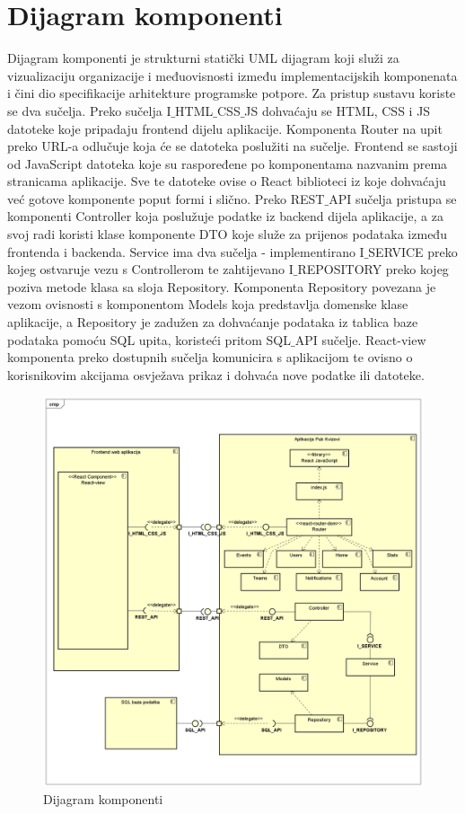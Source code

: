 		\eject
		\section{Dijagram komponenti}
		
			Dijagram komponenti je strukturni statički UML dijagram koji služi za vizualizaciju organizacije i međuovisnosti između implementacijskih komponenata i čini dio specifikacije arhitekture programske potpore. Za pristup sustavu koriste se dva sučelja. Preko sučelja I$\_$HTML$\_$CSS$\_$JS dohvaćaju se HTML, CSS i JS datoteke koje pripadaju frontend dijelu aplikacije. Komponenta Router na upit preko URL-a odlučuje koja će se datoteka poslužiti na sučelje. Frontend se sastoji od JavaScript datoteka koje su raspoređene po komponentama nazvanim prema stranicama aplikacije. Sve te datoteke ovise o React biblioteci iz koje dohvaćaju već gotove komponente poput formi i slično. Preko REST$\_$API sučelja pristupa se komponenti Controller koja poslužuje podatke iz backend dijela aplikacije, a za svoj radi koristi klase komponente DTO koje služe za prijenos podataka između frontenda i backenda. Service ima dva sučelja - implementirano I$\_$SERVICE preko kojeg ostvaruje vezu s Controllerom te zahtijevano I$\_$REPOSITORY preko kojeg poziva metode klasa sa sloja Repository. Komponenta Repository povezana je vezom ovisnosti s komponentom Models koja predstavlja domenske klase aplikacije, a Repository je zadužen za dohvaćanje podataka iz tablica baze podataka pomoću SQL upita, koristeći pritom SQL$\_$API sučelje. React-view komponenta preko dostupnih sučelja komunicira s aplikacijom te ovisno o korisnikovim akcijama osvježava prikaz i dohvaća nove podatke ili datoteke.
			
			\begin{figure}[H]
				\includegraphics[width=\textwidth]{dijagrami/ComponentDiagram.PNG} 
				\caption{Dijagram komponenti}
				\label{fig:ComponentDiagram}
			\end{figure}
		
	